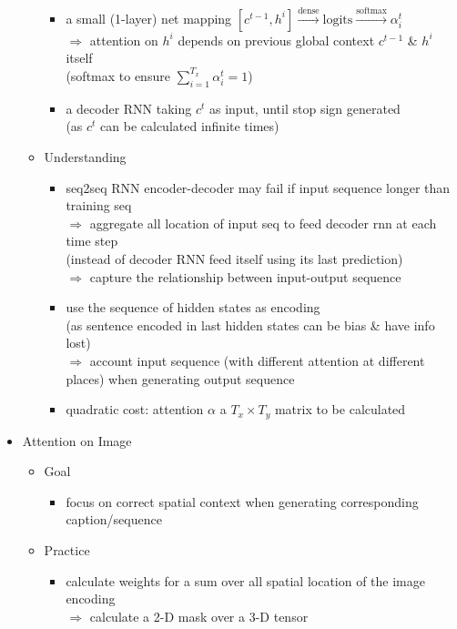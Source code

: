 \begin{itemize}
\begin{itemize}
\begin{itemize}
		\item a small (1-layer) net mapping $[c^{t-1}, h^{i}] \xrightarrow[]{\text{dense}} \text{logits} \xrightarrow[]{\text{softmax}} \alpha^t_{i}$ \\
		$\Rightarrow$ attention on $h^i$ depends on previous global context $c^{t-1}$ \& $h^i$ itself \\
		(softmax to ensure $\sum_{i=1}^{T_x}\alpha^t_i=1$)
		\item a decoder RNN taking $c^{t}$ as input, until stop sign generated \\
		(as $c^t$ can be calculated infinite times)
		\end{itemize}
	\item Understanding
		\begin{itemize}
		\item seq2seq RNN encoder-decoder may fail if input sequence longer than training seq \\
		$\Rightarrow$ aggregate all location of input seq to feed decoder rnn at each time step \\
		(instead of decoder RNN feed itself using its last prediction) \\
		$\Rightarrow$ capture the relationship between input-output sequence
		\item use the sequence of hidden states as encoding \\ 
		(as sentence encoded in last hidden states can be bias \& have info lost) \\
		$\Rightarrow$ account input sequence (with different attention at different places) when generating output sequence
		\item quadratic cost: attention $\alpha$ a $T_x\times T_y$ matrix to be calculated 
		\end{itemize}
	\end{itemize}
	
\item Attention on Image
	\begin{itemize}
	\item Goal
		\begin{itemize}
		\item focus on correct spatial context when generating corresponding caption/sequence
		\end{itemize}
	\item Practice
		\begin{itemize}
		\item calculate weights for a sum over all spatial location of the image encoding \\
		$\Rightarrow$ calculate a 2-D mask over a 3-D tensor
		\end{itemize}
	\end{itemize}


\end{itemize}
